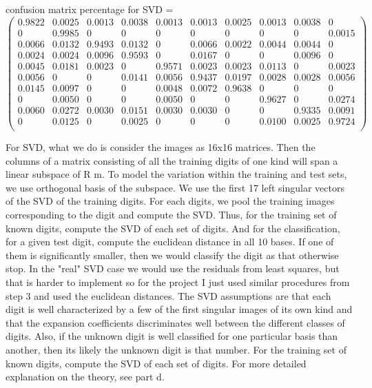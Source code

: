 \documentclass{article}
\begin{document}
\bigskip
\bigskip
confusion matrix percentage for SVD = 
$
\begin{pmatrix}
    0.9822  &  0.0025 &   0.0013  &  0.0038   & 0.0013   & 0.0013   & 0.0025  &  0.0013  &  0.0038    &     0 \\
         0   & 0.9985   &      0      &   0      &   0        & 0      &   0      &   0     &    0  &  0.0015\\
    0.0066  &  0.0132  &  0.9493  &  0.0132    &     0  &  0.0066  &  0.0022 &   0.0044  &  0.0044    &     0\\
    0.0024  &  0.0024  &  0.0096   & 0.9593     &    0  &  0.0167   &      0      &   0  &  0.0096     &    0\\
    0.0045  &  0.0181  &  0.0023  &       0  &  0.9571   & 0.0023   & 0.0023 &   0.0113   &      0   & 0.0023\\
    0.0056   &      0      &   0 &   0.0141 &   0.0056  &  0.9437   & 0.0197   & 0.0028    &0.0028   & 0.0056\\
    0.0145 &   0.0097  &       0   &      0   & 0.0048   & 0.0072    &0.9638    &     0   &      0      &   0\\
         0  &  0.0050      &   0    &     0  &  0.0050    &     0      &   0   & 0.9627 &        0    &0.0274\\
    0.0060   & 0.0272 &   0.0030  &  0.0151  &  0.0030   & 0.0030    &     0&         0   & 0.9335    &0.0091\\
         0  &  0.0125   &      0  &  0.0025       &  0         &0     &    0   & 0.0100  &  0.0025 &   0.9724\\
\end{pmatrix} $
\\

\bigskip 

For SVD, what we do is consider the images as 16x16 matrices. Then the columns of a matrix consisting of all the training digits of one kind will span a linear subspace of R m. To model the variation within the training and test sets, we use orthogonal basis of the subspace. We use the first 17 left singular vectors of the SVD of the training digits. For each digits, we pool the training images corresponding to the digit and compute the SVD. Thus, for the training set of known digits, compute the SVD of each set of digits. And for the classification, for a given test digit, compute the euclidean distance in all 10 bases. If one of them is significantly smaller, then we would classify the digit as that otherwise stop. In the "real" SVD case we would use the residuals from least squares, but that is harder to implement so for the project I just used similar procedures from step 3 and used the euclidean distances. The SVD assumptions are that each digit is well characterized by a few of the first singular images of its own kind and that the expansion coefficients discriminates well between the different classes of digits. Also, if the unknown digit is well classified for one particular basis than another, then its likely the unknown digit is that number. For the training set of known digits, compute the SVD of each set of digits. For more detailed explanation on the theory, see part d. \\
\end{document}
